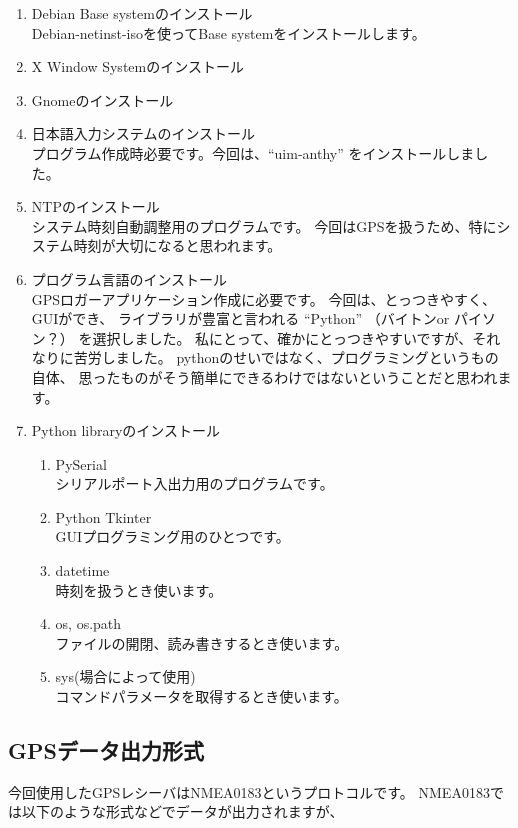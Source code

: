 \documentclass[mingoth,a4paper]{jsarticle}
\begin{document}
\begin{enumerate}
      \item Debian Base systemのインストール \\
    Debian-netinst-isoを使ってBase systemをインストールします。
      \item X Window Systemのインストール
      \item Gnomeのインストール
      \item 日本語入力システムのインストール \\
    プログラム作成時必要です。今回は、``uim-anthy'' をインストールしました。
      \item NTPのインストール \\
    システム時刻自動調整用のプログラムです。
    今回はGPSを扱うため、特にシステム時刻が大切になると思われます。
      \item プログラム言語のインストール \\
    GPSロガーアプリケーション作成に必要です。
    今回は、とっつきやすく、GUIができ、
    ライブラリが豊富と言われる ``Python'' （バイトンor パイソン？）
    を選択しました。
    私にとって、確かにとっつきやすいですが、それなりに苦労しました。
    pythonのせいではなく、プログラミングというもの自体、
    思ったものがそう簡単にできるわけではないということだと思われます。
      \item Python libraryのインストール
    \begin{enumerate}
          \item PySerial \\
        シリアルポート入出力用のプログラムです。
          \item Python Tkinter \\
        GUIプログラミング用のひとつです。
          \item datetime \\
        時刻を扱うとき使います。
          \item os, os.path \\
        ファイルの開閉、読み書きするとき使います。
          \item sys(場合によって使用) \\
        コマンドパラメータを取得するとき使います。
    \end{enumerate}
\end{enumerate}

\subsection{GPSデータ出力形式}
今回使用したGPSレシーバはNMEA0183というプロトコルです。
NMEA0183では以下のような形式などでデータが出力されますが、
\end{document}

